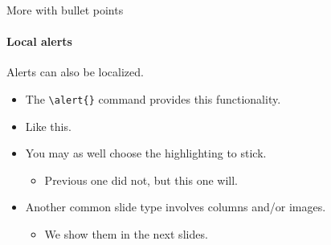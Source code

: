 \documentclass{beamer}
\begin{document}
\begin{frame}[fragile]{More with bullet points}
\framesubtitle{Local alerts}
Alerts can also be localized.
\begin{itemize}
\item The \verb|\alert{}| command provides this functionality.
\item Like \alert<2>{this}.
\item You may as well choose the highlighting to stick.
    \begin{itemize}
    \item Previous one did not, but \alert<3->{this one} will.
    \end{itemize}
\item Another common slide type involves columns and/or images.
    \begin{itemize}
    \item We show them in the \alert<4>{next slides}.
    \end{itemize}
\end{itemize}
\end{frame}
\end{document}
